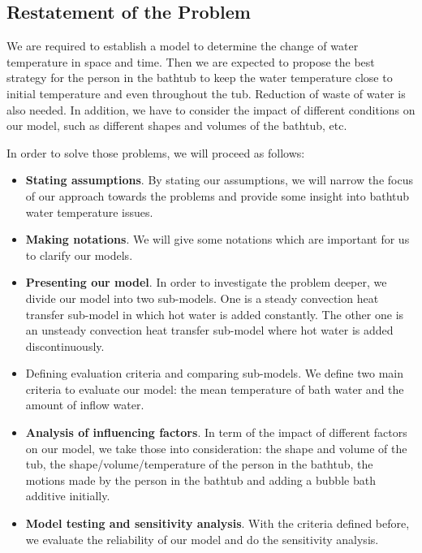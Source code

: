 \documentclass{mcmthesis}
\begin{document}
\subsection{Restatement of the Problem}

We are required to establish a model to determine the change of water temperature 
in space and time. Then we are expected to propose the best strategy for the 
person in the bathtub to keep the water temperature close to initial temperature 
and even throughout the tub. Reduction of waste of water is also needed. In 
addition, we have to consider the impact of different conditions on our model, 
such as different shapes and volumes of the bathtub, etc.

In order to solve those problems, we will proceed as follows:

\begin{itemize}
\item {\bf Stating assumptions}. By stating our assumptions, we will narrow the 
focus of our approach towards the problems and provide some insight into bathtub 
water temperature issues.

\item {\bf Making notations}. We will give some notations which are important for 
us to clarify our models.

\item {\bf Presenting our model}. In order to investigate the problem deeper, we divide our model into two sub-models. One is a steady convection heat transfer 
sub-model in which hot water is added constantly. The other one is an unsteady 
convection heat transfer sub-model where hot water is added discontinuously.

\item {Defining evaluation criteria and comparing sub-models}. We define two main 
criteria to evaluate our model: the mean temperature of bath water and the amount 
of inflow water.

\item {\bf Analysis of influencing factors}. In term of the impact of different 
factors on our model, we take those into consideration: the shape and volume of 
the tub, the shape/volume/temperature of the person in the bathtub, the motions 
made by the person in the bathtub and adding a bubble bath additive initially.

\item {\bf Model testing and sensitivity analysis}. With the criteria defined 
before, we evaluate the reliability of our model and do the sensitivity analysis.


\end{itemize}
\end{document}
